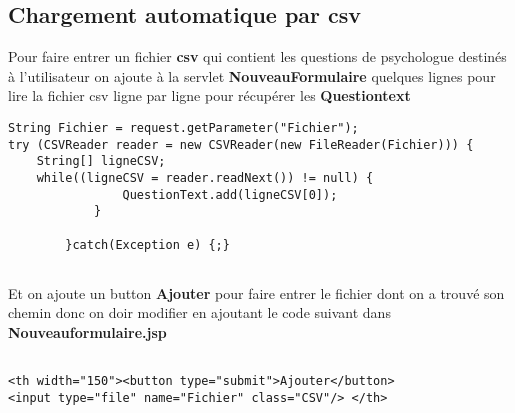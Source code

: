 \documentclass[12]{article}
\begin{document}
\subsection{Chargement automatique par csv}


Pour faire entrer un fichier \textbf{csv} qui contient les questions de psychologue destinés à l'utilisateur on ajoute à la servlet \textbf{NouveauFormulaire} quelques lignes pour lire la fichier csv ligne par ligne pour récupérer les \textbf{Questiontext}

\begin{scriptsize}
\lstset{language=java}
\begin{lstlisting}
String Fichier = request.getParameter("Fichier");
try (CSVReader reader = new CSVReader(new FileReader(Fichier))) {
	String[] ligneCSV;
	while((ligneCSV = reader.readNext()) != null) {
				QuestionText.add(ligneCSV[0]);
			}

		}catch(Exception e) {;}


\end{lstlisting}
\end{scriptsize}

Et on ajoute un button \textbf{Ajouter} pour faire entrer le fichier dont on a trouvé son chemin
donc on doir modifier en ajoutant le code suivant dans \textbf{Nouveauformulaire.jsp}

\begin{scriptsize}
\lstset{language=XML}
\begin{lstlisting}

<th width="150"><button type="submit">Ajouter</button> 
<input type="file" name="Fichier" class="CSV"/> </th>

\end{lstlisting}
\end{scriptsize}
\end{document}
